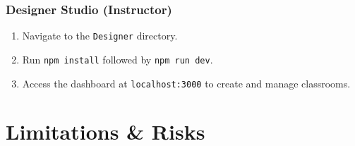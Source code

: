 \documentclass[12pt,a4paper]{article}
\begin{document}
\subsubsection{Designer Studio (Instructor)}
\begin{enumerate}[leftmargin=1.4cm]
  \item Navigate to the \texttt{Designer} directory.
  \item Run \texttt{npm install} followed by \texttt{npm run dev}.
  \item Access the dashboard at \texttt{localhost:3000} to create and manage classrooms.
\end{enumerate}

\section{Limitations \& Risks}
\end{document}
